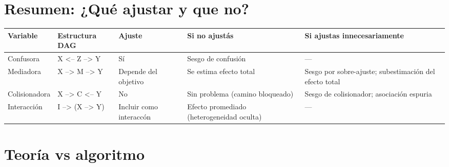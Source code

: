 \documentclass[
  spanish,
  a4paper,
]{scrbook}
\newcounter{none} %
\begin{document}
\section{Resumen: ¿Qué ajustar y que
no?}\label{resumen-quuxe9-ajustar-y-que-no}

{\def\LTcaptype{none} %
\begin{longtable}[]{@{}
  >{\raggedright\arraybackslash}p{}
  >{\raggedright\arraybackslash}p{}
  >{\raggedright\arraybackslash}p{}
  >{\raggedright\arraybackslash}p{}
  >{\raggedright\arraybackslash}p{}@{}}
\toprule\noalign{}
\begin{minipage}[b]{\linewidth}\raggedright
Variable
\end{minipage} & \begin{minipage}[b]{\linewidth}\raggedright
Estructura DAG
\end{minipage} & \begin{minipage}[b]{\linewidth}\raggedright
Ajuste
\end{minipage} & \begin{minipage}[b]{\linewidth}\raggedright
Si no ajustás
\end{minipage} & \begin{minipage}[b]{\linewidth}\raggedright
Si ajustas innecesariamente
\end{minipage} \\
\midrule\noalign{}
\endhead
\bottomrule\noalign{}
\endlastfoot
Confusora & X \textless-- Z --\textgreater{} Y & Sí & Sesgo de confusión
& --- \\
Mediadora & X --\textgreater{} M --\textgreater{} Y & Depende del
objetivo & Se estima efecto total & Sesgo por sobre-ajuste;
subestimación del efecto total \\
Colisionadora & X --\textgreater{} C \textless-- Y & No & Sin problema
(camino bloqueado) & Sesgo de colisionador; asociación espuria \\
Interacción & I --\textgreater{} (X --\textgreater{} Y) & Incluir como
interaccón & Efecto promediado (heterogeneidad oculta) & --- \\
\end{longtable}
}

\section{Teoría vs algoritmo}\label{teoruxeda-vs-algoritmo}
\end{document}
